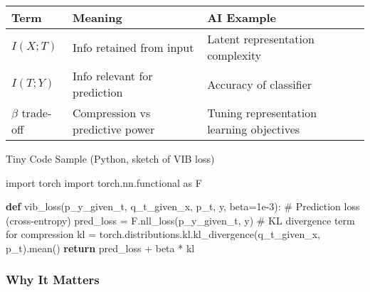 \documentclass[
  letterpaper,
  DIV=11,
  numbers=noendperiod]{scrreprt}
\newenvironment{Shaded}{\begin{snugshade}}{\end{snugshade}}
\newcommand{\CommentTok}[1]{\textcolor[rgb]{0.37,0.37,0.37}{#1}}
\newcommand{\ControlFlowTok}[1]{\textcolor[rgb]{0.00,0.23,0.31}{\textbf{#1}}}
\newcommand{\FloatTok}[1]{\textcolor[rgb]{0.68,0.00,0.00}{#1}}
\newcommand{\ImportTok}[1]{\textcolor[rgb]{0.00,0.46,0.62}{#1}}
\newcommand{\KeywordTok}[1]{\textcolor[rgb]{0.00,0.23,0.31}{\textbf{#1}}}
\newcommand{\NormalTok}[1]{\textcolor[rgb]{0.00,0.23,0.31}{#1}}
\newcommand{\OperatorTok}[1]{\textcolor[rgb]{0.37,0.37,0.37}{#1}}
\begin{document}
\begin{longtable}[]{@{}
  >{\raggedright\arraybackslash}p{}
  >{\raggedright\arraybackslash}p{}
  >{\raggedright\arraybackslash}p{}@{}}
\toprule\noalign{}
\begin{minipage}[b]{\linewidth}\raggedright
Term
\end{minipage} & \begin{minipage}[b]{\linewidth}\raggedright
Meaning
\end{minipage} & \begin{minipage}[b]{\linewidth}\raggedright
AI Example
\end{minipage} \\
\midrule\noalign{}
\endhead
\bottomrule\noalign{}
\endlastfoot
\(I(X;T)\) & Info retained from input & Latent representation
complexity \\
\(I(T;Y)\) & Info relevant for prediction & Accuracy of classifier \\
\(\beta\) trade-off & Compression vs predictive power & Tuning
representation learning objectives \\
\end{longtable}

Tiny Code Sample (Python, sketch of VIB loss)

\begin{Shaded}
\begin{Highlighting}[]
\ImportTok{import}\NormalTok{ torch}
\ImportTok{import}\NormalTok{ torch.nn.functional }\ImportTok{as}\NormalTok{ F}

\KeywordTok{def}\NormalTok{ vib\_loss(p\_y\_given\_t, q\_t\_given\_x, p\_t, y, beta}\OperatorTok{=}\FloatTok{1e{-}3}\NormalTok{):}
    \CommentTok{\# Prediction loss (cross{-}entropy)}
\NormalTok{    pred\_loss }\OperatorTok{=}\NormalTok{ F.nll\_loss(p\_y\_given\_t, y)}
    \CommentTok{\# KL divergence term for compression}
\NormalTok{    kl }\OperatorTok{=}\NormalTok{ torch.distributions.kl.kl\_divergence(q\_t\_given\_x, p\_t).mean()}
    \ControlFlowTok{return}\NormalTok{ pred\_loss }\OperatorTok{+}\NormalTok{ beta }\OperatorTok{*}\NormalTok{ kl}
\end{Highlighting}
\end{Shaded}

\subsubsection{Why It Matters}\label{why-it-matters-65}
\end{document}
